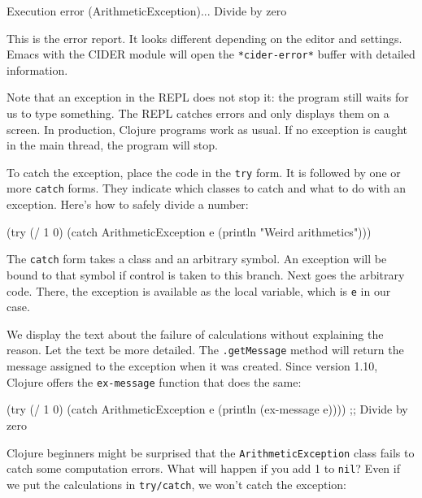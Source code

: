 
\begin{text}
Execution error (ArithmeticException)...
Divide by zero
\end{text}

This is the error report. It looks different depending on the editor and settings. Emacs with the CIDER module will open the \texttt{*cider\--error*} buffer with detailed information.


Note that an exception in the REPL does not stop it: the program still waits for us to type something. The REPL catches errors and only displays them on a screen. In production, Clojure programs work as usual. If no exception is caught in the main thread, the program will stop.

To catch the exception, place the code in the \verb|try| form. It is followed by one or more \verb|catch| forms. They indicate which classes to catch and what to do with an exception. Here's how to safely divide a number:


\begin{clojure}
(try
  (/ 1 0)
  (catch ArithmeticException e
    (println "Weird arithmetics")))
\end{clojure}

The \verb|catch| form takes a class and an arbitrary symbol. An exception will be bound to that symbol if control is taken to this branch. Next goes the arbitrary code. There, the exception is available as the local variable, which is \verb|e| in our case.


We display the text about the failure of calculations without explaining the reason. Let the text be more detailed. The \verb|.getMessage| method will return the message assigned to the exception when it was created. Since version 1.10, Clojure offers the \verb|ex-message| function that does the same:

\begin{clojure}
(try
  (/ 1 0)
  (catch ArithmeticException e
    (println (ex-message e))))
;; Divide by zero
\end{clojure}

Clojure beginners might be surprised that the \verb|ArithmeticException| class fails to catch some computation errors. What will happen if you add 1 to \verb|nil|? Even if we put the calculations in \verb|try/catch|, we won't catch the exception:

